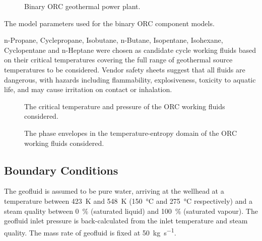         \begin{figure}[H]
            \centering
            
            \caption{Binary \ac{ORC} geothermal power plant.}
            \label{fig:prosim_purewater_ORC}
        \end{figure}

        \begin{table}[H]
            \centering
            \caption{The model parameters used for the binary \ac{ORC} component models.}
            \label{table:prosim_pure_water_ORC_inputs}
                    
        \end{table}

        n-Propane, Cyclepropane, Isobutane, n-Butane, Isopentane, Isohexane, Cyclopentane and n-Heptane were chosen as candidate cycle working fluids based on their critical temperatures covering the full range of geothermal source temperatures to be considered. Vendor safety sheets \cite{Airgas2024} suggest that all fluids are dangerous, with hazards including flammability, explosiveness, toxicity to aquatic life, and may cause irritation on contact or inhalation. 

        \begin{figure}[H]
            \centering
            
            \caption{The critical temperature and pressure of the \ac{ORC} working fluids considered.}
            \label{fig:prosim_purewater_wfs}
        \end{figure}

        \begin{figure}[H]
            \centering
            
            \caption{The phase envelopes in the temperature-entropy domain of the \ac{ORC} working fluids considered.}
            \label{fig:prosim_purewater_wfs_envelopes}
        \end{figure}

\subsection{Boundary Conditions}
    The geofluid is assumed to be pure water, arriving at the wellhead at a temperature between \qty{423}{\K} and \qty{548}{\K} (\qty{150}{\degreeCelsius} and \qty{275}{\degreeCelsius} respectively) and a steam quality between \qty{0}{\percent} (saturated liquid) and \qty{100}{\percent} (saturated vapour). The geofluid inlet pressure is back-calculated from the inlet temperature and steam quality. The mass rate of geofluid is fixed at \qty{50}{\kg\per\s}.

